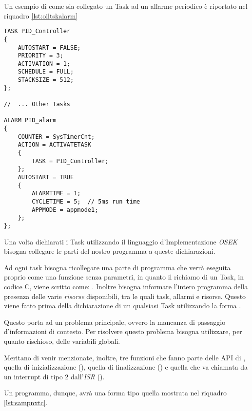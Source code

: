 Un esempio di come sia collegato un Task ad un allarme periodico è
riportato nel riquadro \ref{lst:oiltskalarm}
\begin{figure*}[htbp]
    \begin{lstlisting}[caption=Sample Task-Alarm declaration,
                       label=lst:oiltskalarm]
TASK PID_Controller
{
    AUTOSTART = FALSE;
    PRIORITY = 3;
    ACTIVATION = 1;
    SCHEDULE = FULL;
    STACKSIZE = 512;
};

//  ... Other Tasks

ALARM PID_alarm
{
    COUNTER = SysTimerCnt;
    ACTION = ACTIVATETASK
    {
        TASK = PID_Controller;
    };
    AUTOSTART = TRUE
    {
        ALARMTIME = 1;
        CYCLETIME = 5;  // 5ms run time
        APPMODE = appmode1;
    };
};
    \end{lstlisting}
\end{figure*}

Una volta dichiarati i Task utilizzando il linguaggio d'Implementazione
\emph{OSEK} bisogna collegare le parti del nostro programma a queste
dichiarazioni.

Ad ogni task bisogna ricollegare una parte di programma che verrà eseguita
proprio come una funzione senza parametri, in quanto il richiamo di un
Task, in codice C, viene scritto come: .
Inoltre bisogna informare l'intero programma della presenza delle varie
\emph{risorse} disponibili, tra le quali task, allarmi e risorse. Questo
viene fatto prima della dichiarazione di un qualsiasi Task utilizzando la
forma .

Questo porta ad un problema principale, ovvero la mancanza di passaggio
d'informazioni di contesto. Per risolvere questo problema bisogna
utilizzare, per quanto rischioso, delle variabili globali.

Meritano di venir menzionate, inoltre, tre funzioni che fanno parte delle
API di \nxtOSEK, quella di inizializzazione (), quella di finalizzazione
() e quella che va
chiamata da un interrupt di tipo 2 dall'\emph{ISR} ().

Un programma, dunque, avrà una forma tipo quella mostrata nel riquadro
\ref{lst:sampnxtc}.

